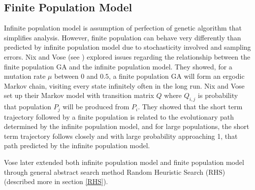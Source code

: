 \subsection{Finite Population Model}
Infinite population model is assumption of perfection of genetic algorithm that simplifies analysis. However, finite population 
can behave very differently than predicted by infinite population model due to stochasticity involved and sampling errors. 
Nix and Vose (see \cite{Nix1992}) explored issues regarding the relationship between the finite population GA and the infinite population model. 
They showed, for a mutation rate $\mu$ between $0$ and $0.5$, a finite population GA will form an ergodic Markov chain, 
visiting every state infinitely often in the long run. Nix and Vose set up their Markov model with transition matrix $Q$ where 
$Q_{i,j}$ is probability that population $P_j$ will be produced from $P_i$. 
They showed that the short term trajectory followed by a finite population is related to 
the evolutionary path determined by the infinite population model, and  
for large populations, the short term trajectory follows closely and 
with large probability approaching 1, that path predicted by 
the infinite population model. 

Vose later extended both infinite population model and finite population model 
through general abstract search method Random Heuristic Search (RHS) (described more in section \ref{RHS}).


